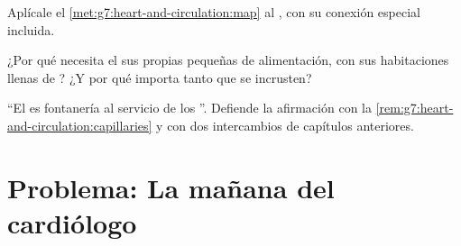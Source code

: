 \begin{exercise}[$\star\star$]\label{exo:g7:heart-and-circulation:10}
Aplícale el \cref{met:g7:heart-and-circulation:map} al , con su conexión especial incluida.
\end{exercise}

\begin{exercise}[$\star\star$]\label{exo:g7:heart-and-circulation:11}
¿Por qué necesita el  sus propias  pequeñas de
alimentación, con sus habitaciones llenas de ? ¿Y por qué importa
tanto que se incrusten?
\end{exercise}

\begin{exercise}[$\star\star\star$]\label{exo:g7:heart-and-circulation:12}
``El  es fontanería al servicio de los ''. Defiende la
afirmación con la \cref{rem:g7:heart-and-circulation:capillaries} y con
dos intercambios de capítulos anteriores.
\end{exercise}

\section{Problema: La mañana del cardiólogo}


